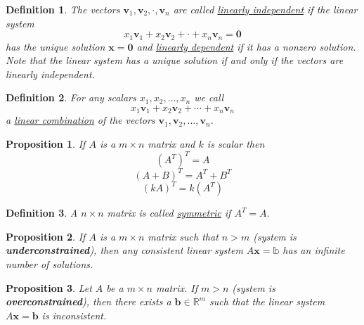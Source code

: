 \documentclass{article}
\theoremstyle{definitionstyle}
\newtheorem{definition}{Definition}[section]
\newtheorem{proposition}{Proposition}[section]
\begin{document}
\begin{definition}
    The vectors $\mathbf{v}_1,\mathbf{v}_2,\cdot,\mathbf{v}_n$ are called \underline{linearly independent} if 
    the linear system
    \begin{equation*}
        x_1\mathbf{v}_1+x_2\mathbf{v}_2+\cdot+x_n\mathbf{v}_n=\mathbf{0}
    \end{equation*}
    has the unique solution $\mathbf{x}=\mathbf{0}$ and \underline{linearly dependent} if it has a nonzero solution.
    Note that the linear system has a unique solution if and only if the vectors are linearly independent.
\end{definition}

\begin{definition}
    For any scalars $x_1,x_2,\dots,x_n$ we call
    \begin{equation*}
        x_1\mathbf{v}_1+x_2\mathbf{v}_2+\cdots+x_n\mathbf{v}_n
    \end{equation*}
    a \underline{linear combination} of the vectors $\mathbf{v}_1,\mathbf{v}_2,\dots,\mathbf{v}_n$.
\end{definition}

\begin{proposition}
    If $A$ is a $m \times n$ matrix and $k$ is scalar then
    \begin{equation*}
        {(A^T)}^T=A
    \end{equation*}
    \begin{equation*}
        {(A+B)}^T=A^T+B^T
    \end{equation*}
    \begin{equation*}
        {(kA)}^T=k(A^T)
    \end{equation*}
\end{proposition}

\begin{definition}
    A $n \times n$ matrix is called \underline{symmetric} if $A^T=A$.
\end{definition}

\begin{proposition}
    If $A$ is a $m \times n$ matrix such that $n>m$ (system is \textbf{underconstrained}), then
    any consistent linear system $A\mathbf{x}=\mathbb{b}$ has an infinite number of solutions.
\end{proposition}

\begin{proposition}
    Let $A$ be a $m \times n$ matrix. If $m>n$ (system is \textbf{overconstrained}), then
    there exists a $\mathbf{b}\in\mathbb{R}^m$ such that the linear system $A\mathbf{x}=\mathbf{b}$
    is inconsistent.
\end{proposition}
\end{document}
